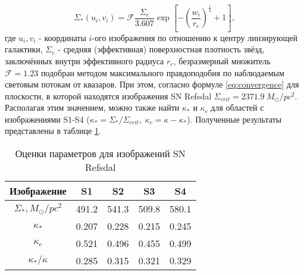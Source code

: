 \begin{equation}\label{vaucouleurs}
\Sigma_*\left(u_{i}, v_{i}\right)=\mathcal{F} \frac{\Sigma_{e}}{3.607} \exp \left[-\left(\frac{w_{i}}{r_{e}}\right)^{\frac{1}{4}}+1\right], 
\end{equation}
где $u_{i}, v_{i}$ - координаты $i$-ого изображения по отношению к центру линзирующей галактики, $\Sigma_e$ - средняя (эффективная) поверхностная плотность звёзд, заключённых внутри эффективного радиуса $r_e$, безразмерный множитель $\mathcal{F}=1.23$ подобран методом максимального правдоподобия по наблюдаемым световым потокам от квазаров. При этом, согласно формуле \eqref{eq:convergence} для плоскости, в которой находятся изображения SN Refsdal  $\Sigma_{crit} = 2371.9 \ M_{\odot}/pc^2 $. Располагая этим значением, можно также найти $\kappa_*$ и $\kappa_c$ для областей с изображениями S1-S4 ($\kappa_*=\Sigma_* /\Sigma_{crit}, \ \kappa_c = \kappa-\kappa_* $). Полученные результаты представлены в таблице \ref{tab:paramsfors1234}.

\begin{table}[H]
 \caption{Оценки параметров для изображений SN Refsdal}
 \label{tab:paramsfors1234}
 \centering
 \begin{tabular}{ | c | c | c | c | c |}
    \hline
    Изображение & S1 & S2 & S3 & S4 \\ \hline
    $\Sigma_*, M_{\odot}/pc^2$ & 491.2 & 541.3 & 509.8 & 580.1\\ \hline
    $\kappa_*$ & 0.207 &  0.228 & 0.215 & 0.245 \\ \hline
    $\kappa_c$ & 0.521 & 0.496 & 0.455 & 0.499 \\ \hline
    $\kappa_*/\kappa$ & 0.285 & 0.315 & 0.321 & 0.329 \\ \hline
 \end{tabular}
\end{table}


